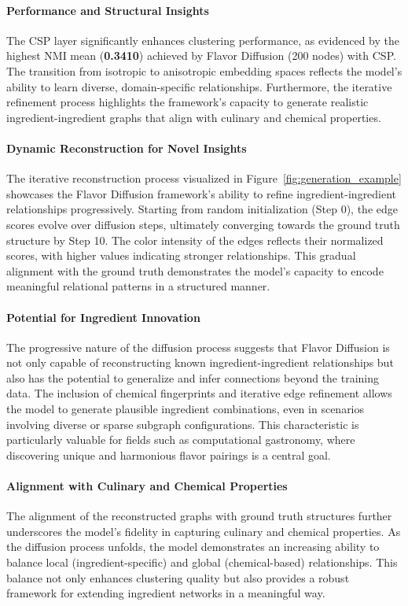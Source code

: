 \paragraph{Performance and Structural Insights}
The CSP layer significantly enhances clustering performance, as evidenced by the highest NMI mean (\textbf{0.3410}) achieved by Flavor Diffusion (200 nodes) with CSP. The transition from isotropic to anisotropic embedding spaces reflects the model's ability to learn diverse, domain-specific relationships. Furthermore, the iterative refinement process highlights the framework's capacity to generate realistic ingredient-ingredient graphs that align with culinary and chemical properties.

\paragraph{Dynamic Reconstruction for Novel Insights}
The iterative reconstruction process visualized in Figure~\ref{fig:generation_example} showcases the Flavor Diffusion framework's ability to refine ingredient-ingredient relationships progressively. Starting from random initialization (Step 0), the edge scores evolve over diffusion steps, ultimately converging towards the ground truth structure by Step 10. The color intensity of the edges reflects their normalized scores, with higher values indicating stronger relationships. This gradual alignment with the ground truth demonstrates the model's capacity to encode meaningful relational patterns in a structured manner.

\paragraph{Potential for Ingredient Innovation}

The progressive nature of the diffusion process suggests that Flavor Diffusion is not only capable of reconstructing known ingredient-ingredient relationships but also has the potential to generalize and infer connections beyond the training data. The inclusion of chemical fingerprints and iterative edge refinement allows the model to generate plausible ingredient combinations, even in scenarios involving diverse or sparse subgraph configurations. This characteristic is particularly valuable for fields such as computational gastronomy, where discovering unique and harmonious flavor pairings is a central goal.

\paragraph{Alignment with Culinary and Chemical Properties}
The alignment of the reconstructed graphs with ground truth structures further underscores the model’s fidelity in capturing culinary and chemical properties. As the diffusion process unfolds, the model demonstrates an increasing ability to balance local (ingredient-specific) and global (chemical-based) relationships. This balance not only enhances clustering quality but also provides a robust framework for extending ingredient networks in a meaningful way.